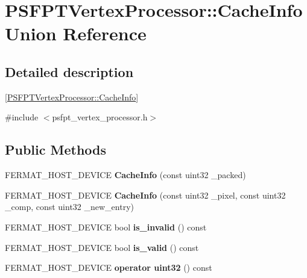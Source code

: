 \hypertarget{union_p_s_f_p_t_vertex_processor_1_1_cache_info}{}\section{P\+S\+F\+P\+T\+Vertex\+Processor\+:\+:Cache\+Info Union Reference}
\label{union_p_s_f_p_t_vertex_processor_1_1_cache_info}


\subsection{Detailed description}
\mbox{[}\hyperlink{union_p_s_f_p_t_vertex_processor_1_1_cache_info}{P\+S\+F\+P\+T\+Vertex\+Processor\+::\+Cache\+Info}\mbox{]} 

{\ttfamily \#include $<$psfpt\+\_\+vertex\+\_\+processor.\+h$>$}

\subsection*{Public Methods}
\begin{DoxyCompactItemize}
\item 
\mbox{\label{union_p_s_f_p_t_vertex_processor_1_1_cache_info_ad1cc7e010a84c5cce28117f19fa4166f}} 
F\+E\+R\+M\+A\+T\+\_\+\+H\+O\+S\+T\+\_\+\+D\+E\+V\+I\+CE {\bfseries Cache\+Info} (const uint32 \+\_\+packed)
\item 
\mbox{\label{union_p_s_f_p_t_vertex_processor_1_1_cache_info_a1c5e8b2253cbf4e74e8107c288e20fd4}} 
F\+E\+R\+M\+A\+T\+\_\+\+H\+O\+S\+T\+\_\+\+D\+E\+V\+I\+CE {\bfseries Cache\+Info} (const uint32 \+\_\+pixel, const uint32 \+\_\+comp, const uint32 \+\_\+new\+\_\+entry)
\item 
\mbox{\label{union_p_s_f_p_t_vertex_processor_1_1_cache_info_a4e9c523d4c4cd8cd0dd749330992c292}} 
F\+E\+R\+M\+A\+T\+\_\+\+H\+O\+S\+T\+\_\+\+D\+E\+V\+I\+CE bool {\bfseries is\+\_\+invalid} () const
\item 
\mbox{\label{union_p_s_f_p_t_vertex_processor_1_1_cache_info_a50cf9f60a51f214a3fe8e0f67be666d9}} 
F\+E\+R\+M\+A\+T\+\_\+\+H\+O\+S\+T\+\_\+\+D\+E\+V\+I\+CE bool {\bfseries is\+\_\+valid} () const
\item 
\mbox{\label{union_p_s_f_p_t_vertex_processor_1_1_cache_info_a0718d9ba7d266f72b51ce8cd943679ed}} 
F\+E\+R\+M\+A\+T\+\_\+\+H\+O\+S\+T\+\_\+\+D\+E\+V\+I\+CE {\bfseries operator uint32} () const
\end{DoxyCompactItemize}

